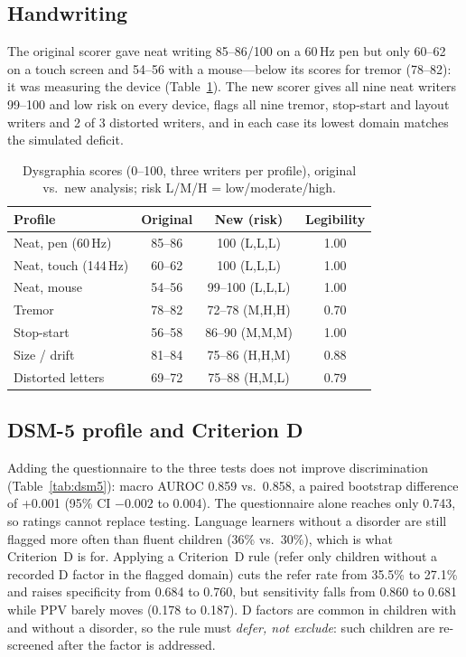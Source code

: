 \documentclass[conference]{IEEEtran}
\begin{document}
\subsection{Handwriting}
The original scorer gave neat writing 85--86/100 on a 60\,Hz pen but only 60--62 on a touch screen and 54--56 with a mouse---below its scores for tremor (78--82): it was measuring the device (Table~\ref{tab:hw}). The new scorer gives all nine neat writers 99--100 and low risk on every device, flags all nine tremor, stop-start and layout writers and 2 of 3 distorted writers, and in each case its lowest domain matches the simulated deficit.

\begin{table}[!t]
\centering
\caption{Dysgraphia scores (0--100, three writers per profile), original vs.\ new analysis; risk L/M/H = low/moderate/high.}
\label{tab:hw}
\footnotesize
\setlength{\tabcolsep}{3pt}
\begin{tabular}{@{}lccc@{}}
\toprule
Profile & Original & New (risk) & Legibility \\
\midrule
Neat, pen (60\,Hz) & 85--86 & 100 (L,L,L) & 1.00 \\
Neat, touch (144\,Hz) & 60--62 & 100 (L,L,L) & 1.00 \\
Neat, mouse & 54--56 & 99--100 (L,L,L) & 1.00 \\
Tremor & 78--82 & 72--78 (M,H,H) & 0.70 \\
Stop-start & 56--58 & 86--90 (M,M,M) & 1.00 \\
Size / drift & 81--84 & 75--86 (H,H,M) & 0.88 \\
Distorted letters & 69--72 & 75--88 (H,M,L) & 0.79 \\
\bottomrule
\end{tabular}
\end{table}

\subsection{DSM-5 profile and Criterion D}
Adding the questionnaire to the three tests does not improve discrimination (Table~\ref{tab:dsm5}): macro AUROC 0.859 vs.\ 0.858, a paired bootstrap difference of +0.001 (95\% CI $-0.002$ to 0.004). The questionnaire alone reaches only 0.743, so ratings cannot replace testing. Language learners without a disorder are still flagged more often than fluent children (36\% vs.\ 30\%), which is what Criterion~D is for. Applying a Criterion~D rule (refer only children without a recorded D factor in the flagged domain) cuts the refer rate from 35.5\% to 27.1\% and raises specificity from 0.684 to 0.760, but sensitivity falls from 0.860 to 0.681 while PPV barely moves (0.178 to 0.187). D factors are common in children with and without a disorder, so the rule must \emph{defer, not exclude}: such children are re-screened after the factor is addressed.
\end{document}
